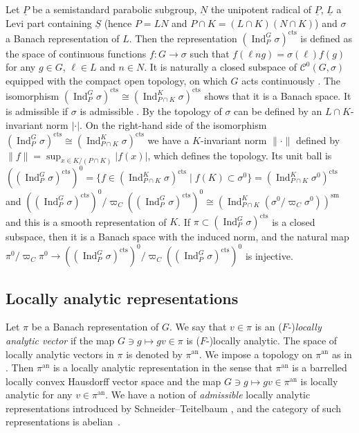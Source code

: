 \documentclass[a4paper]{amsart}
\numberwithin{equation}{section}
\theoremstyle{remark}
\theoremstyle{definition}
\DeclareMathOperator{\Ind}{Ind}
\newcommand{\sm}{\mathrm{sm}}
\newcommand{\alggrp}[1]{\underline{#1}}
\newcommand{\an}{\mathrm{an}}
\newcommand{\cts}{\mathrm{cts}}
\renewcommand{\simeq}{\cong}
\begin{document}
Let $\alggrp{P}$ be a semistandard parabolic subgroup, $\alggrp{N}$ the unipotent radical of $\alggrp{P}$, $\alggrp{L}$ a Levi part containing $\alggrp{S}$ (hence $P = LN$ and $P\cap K = (L\cap K)(N\cap K)$) and $\sigma$ a Banach representation of $L$.
Then the representation $(\Ind_{P}^{G}\sigma)^{\cts}$ is defined as the space of continuous functions $f\colon G\to \sigma$ such that $f(\ell ng) = \sigma(\ell)f(g)$ for any $g\in G$, $\ell\in L$ and $n\in N$.
It is naturally a closed subspace of $\mathcal C^0(G,\sigma)$ equipped with the compact open topology, on which $G$ acts continuously \cite[Proposition 3.1.5]{locallyanalytic-memoir}.
The isomorphism $(\Ind_{P}^{G}\sigma)^{\cts} \cong (\Ind_{P \cap K}^{K}\sigma)^{\cts}$ shows that it is a Banach space.
It is admissible if $\sigma$ is admissible \cite[Lemma 3.3]{fu}.
By \cite[Lemma 6.5.5]{locallyanalytic-memoir} the topology of $\sigma$ can be defined by an $L\cap K$-invariant norm $\lvert\cdot\rvert$.
On the right-hand side of the isomorphism $(\Ind_{P}^{G}\sigma)^{\cts}\simeq(\Ind_{P\cap K}^{K}\sigma)^{\cts}$ we have a $K$-invariant norm $\lVert\cdot\rVert$ defined by $\lVert f\rVert = \sup_{x\in K/(P\cap K)}\lvert f(x)\rvert$, which defines the topology.
Its unit ball is $((\Ind_{P}^{G}\sigma)^{\cts})^{0} = \{f\in (\Ind_{P\cap K}^{K}\sigma)^{\cts}\mid f(K)\subset \sigma^{0}\} = (\Ind_{P\cap K}^{K}\sigma^{0})^{\cts}$ and $((\Ind_{P}^{G}\sigma)^{\cts})^{0}/\varpi_{C}((\Ind_{P}^{G}\sigma)^{\cts})^{0}\simeq (\Ind_{P\cap K}^{K}(\sigma^{0}/\varpi_{C}\sigma^{0}))^{\sm}$ and this is a smooth representation of $K$.
If $\pi\subset(\Ind_{P}^{G}\sigma)^{\cts}$ is a closed subspace, then it is a Banach space with the induced norm, and
the natural map $\pi^0/\varpi_{C}\pi^0\to ((\Ind_{P}^{G}\sigma)^{\cts})^{0}/\varpi_{C}((\Ind_{P}^{G}\sigma)^{\cts})^{0}$ is injective.


\subsection{Locally analytic representations}
\label{sec:locally-analyt-repr}
Let $\pi$ be a Banach representation of $G$.
We say that $v\in \pi$ is an ($F$-)\emph{locally analytic vector} if the map $G\ni g\mapsto gv\in \pi$ is ($F$-)locally analytic.
The space of locally analytic vectors in $\pi$ is denoted by $\pi^{\an}$.
We impose a topology on $\pi^{\an}$ as in \cite[Definition~3.5.3]{locallyanalytic-memoir}.
Then $\pi^{\an}$ is a locally analytic representation in the sense that $\pi^{\an}$ is a barrelled locally convex Hausdorff vector space and the map $G\ni g\mapsto gv\in \pi^{\an}$ is locally analytic for any $v\in \pi^{\an}$.
We have a notion of \emph{admissible} locally analytic representations introduced by Schneider--Teitelbaum \cite[page 176]{ST}, and the category of such representations is abelian~\cite[Proposition~6.4]{ST}.
\end{document}

